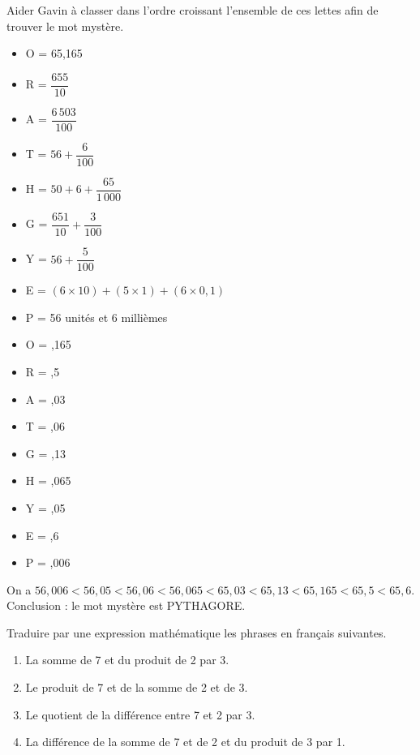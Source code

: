 \begin{colonne*exercice}
\bigskip


\begin{exercice} %
   Aider Gavin à classer dans l'ordre croissant l'ensemble de ces lettes afin de trouver le mot mystère. \smallskip
   \begin{itemize}
      \item O = 65,165 \medskip
      \item R = $\dfrac{655}{10}$ \medskip
      \item A = $\dfrac{6\,503}{100}$ \medskip
      \item T = $56+\dfrac{6}{100}$ \medskip
      \item H = $50+6+\dfrac{65}{1\,000}$ \medskip
      \item G = $\dfrac{651}{10}+\dfrac{3}{100}$ \medskip
      \item Y = $56+\dfrac{5}{100}$ \medskip
      \item E = $(6\times10)+(5\times1)+(6\times0,1)$ \smallskip
      \item P = 56 unités et 6 millièmes
   \end{itemize}
\end{exercice}

\begin{corrige}
   \begin{itemize}
      \item O = ,165
      \item R = ,5
      \item A = ,03
      \item T = ,06
      \item G = ,13
      \item H = ,065
      \item Y = ,05
      \item E = ,6
      \item P = ,006
   \end{itemize}
   On a {\blue $56,006 < 56,05 < 56,06 < 56,065 < 65,03 < 65,13 < 65,165 < 65,5 < 65,6$}. \\
   Conclusion : le mot mystère est \blue PYTHAGORE. \\
\end{corrige}

\bigskip


\begin{exercice}%
   Traduire par une expression mathématique les phrases en français suivantes.
   \begin{enumerate}
      \item La somme de 7 et du produit de 2 par 3.
      \item Le produit de 7 et de la somme de 2 et de 3.
      \item Le quotient de la différence entre 7 et 2 par 3.
      \item La différence de la somme de 7 et de 2 et du produit de 3 par 1.
   \end{enumerate}
\end{exercice}


\end{colonne*exercice}
